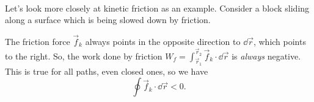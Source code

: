 \documentclass[../classical_mechanics.tex]{subfiles}
\begin{document}
        \paragraph{}
        Let's look more closely at kinetic friction as an example.
        Consider a block sliding along a surface which is being slowed down by friction.
        \begin{figure}[H]
            \centering
        \end{figure}
        The friction force $\vec{f}_k$ always points in the opposite direction to $\dd{\vec{r}}$, which points to the right.
        So, the work done by friction $W_f=\int_{\vec{r}_1}^{\vec{r}_2}\vec{f}_k\cdot\dd{\vec{r}}$ is \textit{always} negative.
        This is true for all paths, even closed ones, so we have
        \begin{equation}
            \oint\vec{f}_k\cdot\dd{\vec{r}}<0.
        \end{equation}
\end{document}
